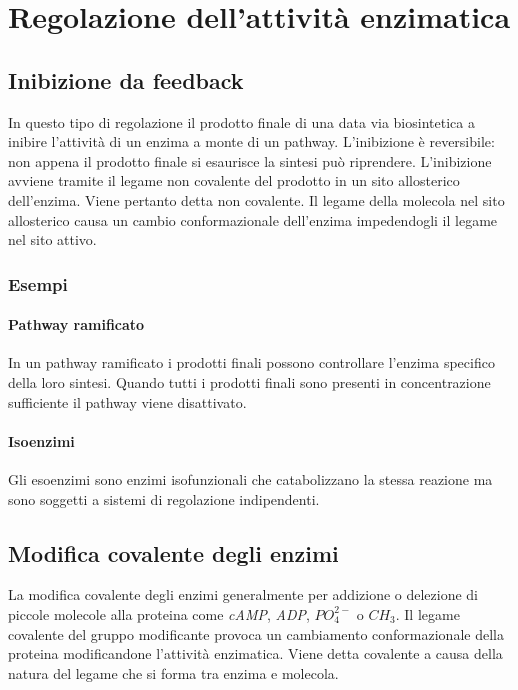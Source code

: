 \section{Regolazione dell'attività enzimatica}
	
	\subsection{Inibizione da feedback}
	In questo tipo di regolazione il prodotto finale di una data via biosintetica a inibire l'attivit\`a di un enzima a monte di un pathway.
	L'inibizione \`e reversibile: non appena il prodotto finale si esaurisce la sintesi pu\`o riprendere.
	L'inibizione avviene tramite il legame non covalente del prodotto in un sito allosterico dell'enzima.
	Viene pertanto detta non covalente.
	Il legame della molecola nel sito allosterico causa un cambio conformazionale dell'enzima impedendogli il legame nel sito attivo.

		\subsubsection{Esempi}

			\paragraph{Pathway ramificato}
			In un pathway ramificato i prodotti finali possono controllare l'enzima specifico della loro sintesi.
			Quando tutti i prodotti finali sono presenti in concentrazione sufficiente il pathway viene disattivato.

			\paragraph{Isoenzimi}
			Gli esoenzimi sono enzimi isofunzionali che catabolizzano la stessa reazione ma sono soggetti a sistemi di regolazione indipendenti.
	
	\subsection{Modifica covalente degli enzimi}
	La modifica covalente degli enzimi generalmente per addizione o delezione di piccole molecole alla proteina come \emph{cAMP}, \emph{ADP}, \emph{$PO_4^{2-}$} o \emph{$CH_3$}.
	Il legame covalente del gruppo modificante provoca un cambiamento conformazionale della proteina modificandone l'attività enzimatica. 
	Viene detta covalente a causa della natura del legame che si forma tra enzima e molecola.

